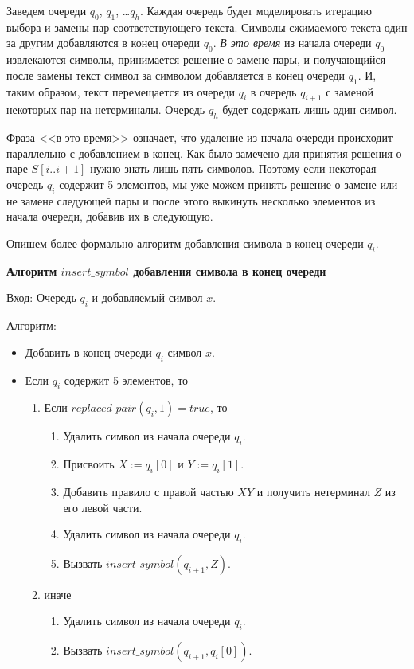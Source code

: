 \documentclass[14pt]{article}
\begin{document}
Заведем очереди $q_0$, $q_1$, \ldots $q_h$. Каждая очередь будет моделировать итерацию выбора и замены пар соответствующего текста.
Символы сжимаемого текста один за другим добавляются в конец очереди $q_0$. {\it В это время} из начала очереди $q_0$ извлекаются символы,
принимается решение о замене пары, и получающийся после замены текст символ за символом добавляется в конец очереди $q_1$. И, таким образом,
текст перемещается из очереди $q_i$ в очередь $q_{i+1}$ с заменой некоторых пар на нетерминалы. Очередь $q_h$ будет содержать лишь один символ.

Фраза <<в это время>> означает, что удаление из начала очереди происходит параллельно с добавлением в конец. Как было замечено
для принятия решения о паре $S[i..i+1]$ нужно знать лишь пять символов. Поэтому если некоторая очередь $q_i$ содержит 5 элементов,
мы уже можем принять решение о замене или не замене следующей пары и после этого выкинуть несколько элементов из начала очереди,
добавив их в следующую.

Опишем более формально алгоритм добавления символа в конец очереди $q_i$.

{\bf Алгоритм $insert\_symbol$ добавления символа в конец очереди}

{\sc Вход:} Очередь $q_i$ и добавляемый символ $x$.

{\sc Алгоритм:}

\begin{itemize}
	\item Добавить в конец очереди $q_i$ символ $x$.
	\item Если $q_i$ содержит 5 элементов, то
	\begin{enumerate}
		\item Если $replaced\_pair(q_i, 1) = true$, то
			\begin{enumerate}
				\item Удалить символ из начала очереди $q_i$.
				\item Присвоить $X := q_i[0]$ и $Y := q_i[1]$.
				\item Добавить правило с правой частью $XY$ и получить нетерминал $Z$ из его левой части.
				\item Удалить символ из начала очереди $q_i$.
				\item Вызвать $insert\_symbol(q_{i+1}, Z)$.
			\end{enumerate}
		\item иначе
			\begin{enumerate}
				\item Удалить символ из начала очереди $q_i$.
				\item Вызвать $insert\_symbol(q_{i+1}, q_i[0])$.
			\end{enumerate}
	\end{enumerate}
\end{itemize}
\end{document}
